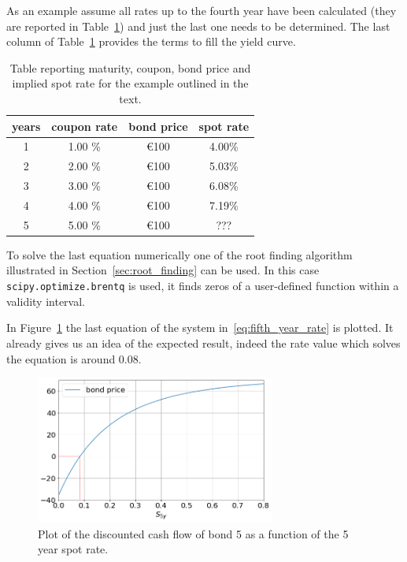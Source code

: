 As an example assume all rates up to the fourth year have been calculated (they are reported in Table~\ref{tab:rates}) and just the last one needs to be determined. The last column of Table~\ref{tab:rates} provides the terms to fill the yield curve.

\begin{table}[htb]
\begin{center}
\begin{tabular}{|c|c|c|c|}
\hline
\textbf{years} & \textbf{coupon rate} & \textbf{bond price} & \textbf{spot rate} \\
\hline
1 & 1.00 \% & \euro{100} & 4.00\% \\
\hline
2 & 2.00 \% & \euro{100} & 5.03\% \\
\hline
3 & 3.00 \% & \euro{100} & 6.08\% \\
\hline
4 & 4.00 \% & \euro{100} & 7.19\% \\
\hline
5 & 5.00 \% & \euro{100} & ??? \\
\hline
\end{tabular}
\end{center}
\caption{Table reporting maturity, coupon, bond price and implied spot rate for the example outlined in the text.}
\label{tab:rates}
\end{table}

To solve the last equation numerically one of the root finding algorithm illustrated in Section~\ref{sec:root_finding} can be used. 
In this case \texttt{scipy.optimize.brentq} is used, it finds zeros of a user-defined function within a validity interval.

In Figure~\ref{fig:fifth_year_rate} the last equation of the system in~\ref{eq:fifth_year_rate} is plotted. It already gives us an idea of the expected result, indeed the rate value which solves the equation is around 0.08.

\begin{figure}[htb]
  \centering
  \includegraphics[width=0.7\textwidth]{figures/bond_5_plot.png}
  \caption{Plot of the discounted cash flow of bond 5 as a function of the 5 year spot rate.}
  \label{fig:fifth_year_rate}
\end{figure}

